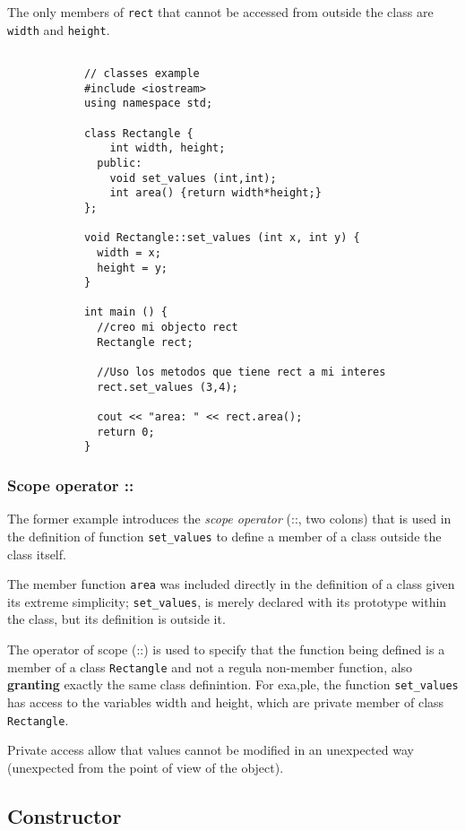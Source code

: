 		The only members of \verb|rect| that cannot be accessed from outside the class are \verb|width| and \verb|height|. 

		\begin{verbatim}

			// classes example
			#include <iostream>
			using namespace std;

			class Rectangle {
			    int width, height;
			  public:
			    void set_values (int,int);
			    int area() {return width*height;}
			};

			void Rectangle::set_values (int x, int y) {
			  width = x;
			  height = y;
			}

			int main () {
			  //creo mi objecto rect
			  Rectangle rect;

			  //Uso los metodos que tiene rect a mi interes
			  rect.set_values (3,4);

			  cout << "area: " << rect.area();
			  return 0;
			}

		\end{verbatim}

		\subsubsection{Scope operator :: }

		The former example introduces the \textit{scope operator} (::, two colons) that is used in the definition of function \verb|set_values| to define a member of a class outside the class itself. 

		The member function \verb|area| was included directly in the definition of a class given its extreme simplicity; \verb|set_values|, is merely declared with its prototype within the class, but its definition is outside it. 

		The operator of scope (::) is used to specify that the function being defined is a member of a class \verb|Rectangle| and not a regula non-member function, also \textbf{granting} exactly the same class definintion. For exa,ple, the function \verb|set_values| has access to the variables width and height, which are private member of class \verb|Rectangle|. 

		Private access allow that values cannot be modified in an unexpected way (unexpected from the point of view of the object).

	\subsection{Constructor}

